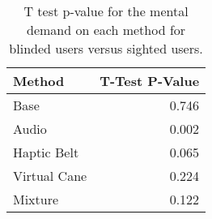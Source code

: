 
\begin{table}[!htb]
\centering
\caption{T test p-value for the mental demand on each method for blinded users versus sighted users.}
\label{tab:ttest_mental_demand}
\begin{tabular}{lr}
\toprule
      Method &  T-Test P-Value \\
\midrule
        Base &           0.746 \\
       Audio &           0.002 \\
 Haptic Belt &           0.065 \\
Virtual Cane &           0.224 \\
     Mixture &           0.122 \\
\bottomrule
\end{tabular}
\end{table}

